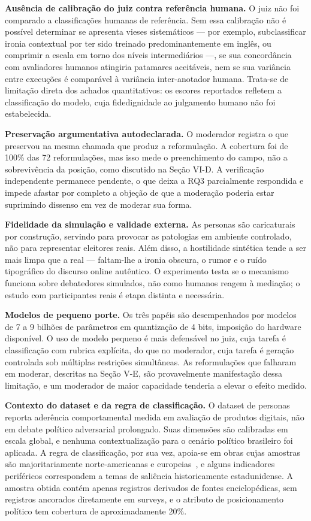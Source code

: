 \documentclass[conference]{IEEEtran} \IEEEoverridecommandlockouts %
\begin{document}
\textbf{Ausência de calibração do juiz contra referência humana.} O juiz não foi
comparado a classificações humanas de referência. Sem essa calibração não é
possível determinar se apresenta vieses sistemáticos — por exemplo,
subclassificar ironia contextual por ter sido treinado predominantemente em
inglês, ou comprimir a escala em torno dos níveis intermediários —, se sua
concordância com avaliadores humanos atingiria patamares aceitáveis, nem se sua
variância entre execuções é comparável à variância inter-anotador humana.
Trata-se de limitação direta dos achados quantitativos: os escores reportados
refletem a classificação do modelo, cuja fidedignidade ao julgamento humano não
foi estabelecida.

\textbf{Preservação argumentativa autodeclarada.} O moderador registra o que
preservou na mesma chamada que produz a reformulação. A cobertura foi de 100\%
das 72 reformulações, mas isso mede o preenchimento do campo, não a
sobrevivência da posição, como discutido na Seção VI-D. A verificação
independente permanece pendente, o que deixa a RQ3 parcialmente respondida e
impede afastar por completo a objeção de que a moderação poderia estar
suprimindo dissenso em vez de moderar sua forma.

\textbf{Fidelidade da simulação e validade externa.} As personas são
caricaturais por construção, servindo para provocar as patologias em ambiente
controlado, não para representar eleitores reais. Além disso, a hostilidade
sintética tende a ser mais limpa que a real — faltam-lhe a ironia obscura, o
rumor e o ruído tipográfico do discurso online autêntico. O experimento testa
se o mecanismo funciona sobre debatedores simulados, não como humanos reagem à
mediação; o estudo com participantes reais é etapa distinta e necessária.

\textbf{Modelos de pequeno porte.} Os três papéis são desempenhados por modelos
de 7 a 9 bilhões de parâmetros em quantização de 4 bits, imposição do hardware
disponível. O uso de modelo pequeno é mais defensável no juiz, cuja tarefa é
classificação com rubrica explícita, do que no moderador, cuja tarefa é geração
controlada sob múltiplas restrições simultâneas. As reformulações que falharam
em moderar, descritas na Seção V-E, são provavelmente manifestação dessa
limitação, e um moderador de maior capacidade tenderia a elevar o efeito
medido.

\textbf{Contexto do dataset e da regra de classificação.} O dataset de personas
reporta aderência comportamental medida em avaliação de produtos digitais, não
em debate político adversarial prolongado. Suas dimensões são calibradas em
escala global, e nenhuma contextualização para o cenário político brasileiro
foi aplicada. A regra de classificação, por sua vez, apoia-se em obras cujas
amostras são majoritariamente norte-americanas e
europeias~\cite{jost2003political,piurko2011basic}, e alguns indicadores
periféricos correspondem a temas de saliência historicamente estadunidense. A
amostra obtida contém apenas registros derivados de fontes enciclopédicas, sem
registros ancorados diretamente em surveys, e o atributo de posicionamento
político tem cobertura de aproximadamente 20\%.
\end{document}
